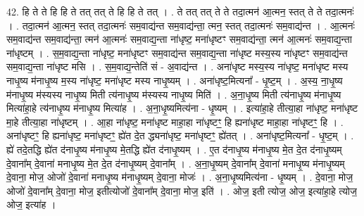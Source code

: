 \documentclass[17pt]{extarticle}
\begin{document}
42. हि ते ते हि हि ते तत् तत् ते हि हि ते तत् । . ते तत् तत् ते ते तदा॒त्मन॑ आ॒त्मन॒ स्तत् ते ते तदा॒त्मनः॑ । . तदा॒त्मन॑ आ॒त्मन॒ स्तत् तदा॒त्मनः॑ सम॒वाद्य॑न्त सम॒वाद्य॑न्ता॒ त्मन॒ स्तत् तदा॒त्मनः॑ सम॒वाद्य॑न्त । . आ॒त्मनः॑ सम॒वाद्य॑न्त सम॒वाद्य॑न्ता॒ त्मन॑ आ॒त्मनः॑ सम॒वाद्य॒न्ता ना॑धृष्ट॒ मना॑धृष्टꣳ सम॒वाद्य॑न्ता॒ त्मन॑ आ॒त्मनः॑ सम॒वाद्य॒न्ता ना॑धृष्टम् । . स॒म॒वाद्य॒न्ता ना॑धृष्ट॒ मना॑धृष्टꣳ सम॒वाद्य॑न्त सम॒वाद्य॒न्ता ना॑धृष्ट मस्य॒स्य ना॑धृष्टꣳ सम॒वाद्य॑न्त सम॒वाद्य॒न्ता ना॑धृष्ट मसि । . स॒म॒वाद्य॒न्तेति॑ सं - अ॒वाद्य॑न्त । . अना॑धृष्ट मस्य॒स्य ना॑धृष्ट॒ मना॑धृष्ट मस्य नाधृ॒ष्य म॑नाधृ॒ष्य म॒स्य ना॑धृष्ट॒ मना॑धृष्ट मस्य नाधृ॒ष्यम् । . अना॑धृष्ट॒मित्यना᳚ - धृ॒ष्ट॒म् । . अ॒स्य॒ ना॒धृ॒ष्य म॑नाधृ॒ष्य म॑स्यस्य नाधृ॒ष्य मिती त्य॑नाधृ॒ष्य म॑स्यस्य नाधृ॒ष्य मिति॑ । . अ॒ना॒धृ॒ष्य मिती त्य॑नाधृ॒ष्य म॑नाधृ॒ष्य मित्या॑हा॒हे त्य॑नाधृ॒ष्य म॑नाधृ॒ष्य मित्या॑ह । . अ॒ना॒धृ॒ष्यमित्य॑ना - धृ॒ष्यम् । . इत्या॑हा॒हे तीत्या॒हा ना॑धृष्ट॒ मना॑धृष्ट मा॒हे तीत्या॒हा ना॑धृष्टम् । . आ॒हा ना॑धृष्ट॒ मना॑धृष्ट माहा॒हा ना॑धृष्टꣳ॒॒ हि ह्यना॑धृष्ट माहा॒हा ना॑धृष्टꣳ॒॒ हि । . अना॑धृष्टꣳ॒॒ हि ह्यना॑धृष्ट॒ मना॑धृष्टꣳ॒॒ ह्ये॑त दे॒त द्ध्यना॑धृष्ट॒ मना॑धृष्टꣳ॒॒ ह्ये॑तत् । . अना॑धृष्ट॒मित्यना᳚ - धृ॒ष्ट॒म् । . ह्ये॑ तदे॒तद्धि ह्ये॑त द॑नाधृ॒ष्य म॑नाधृ॒ष्य मे॒तद्धि ह्ये॑त द॑नाधृ॒ष्यम् । . ए॒त द॑नाधृ॒ष्य म॑नाधृ॒ष्य मे॒त दे॒त द॑नाधृ॒ष्यम् दे॒वाना᳚म् दे॒वाना॑ मनाधृ॒ष्य मे॒त दे॒त द॑नाधृ॒ष्यम् दे॒वाना᳚म् । . अ॒ना॒धृ॒ष्यम् दे॒वाना᳚म् दे॒वाना॑ मनाधृ॒ष्य म॑नाधृ॒ष्यम् दे॒वाना॒ मोज॒ ओजो॑ दे॒वाना॑ मनाधृ॒ष्य म॑नाधृ॒ष्यम् दे॒वाना॒ मोजः॑ । . अ॒ना॒धृ॒ष्यमित्य॑ना - धृ॒ष्यम् । . दे॒वाना॒ मोज॒ ओजो॑ दे॒वाना᳚म् दे॒वाना॒ मोज॒ इतीत्योजो॑ दे॒वाना᳚म् दे॒वाना॒ मोज॒ इति॑ । . ओज॒ इती त्योज॒ ओज॒ इत्या॑हा॒हे त्योज॒ ओज॒ इत्या॑ह । \newline
\pagebreak
{}
\end{document}
